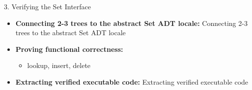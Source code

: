 \documentclass[compress,10pt,xcolor=dvipsnames]{beamer}
\begin{document}
\begin{frame}{3. Verifying the Set Interface}

\begin{itemize}
  \item \textbf{Connecting 2-3 trees to the abstract Set ADT locale:} Connecting 2-3 trees to the abstract Set ADT locale
  \item \textbf{Proving functional correctness:}
    \begin{itemize}
      \item lookup, insert, delete
    \end{itemize}
  \item \textbf{Extracting verified executable code:} Extracting verified executable code
\end{itemize}
\end{frame}
\end{document}
